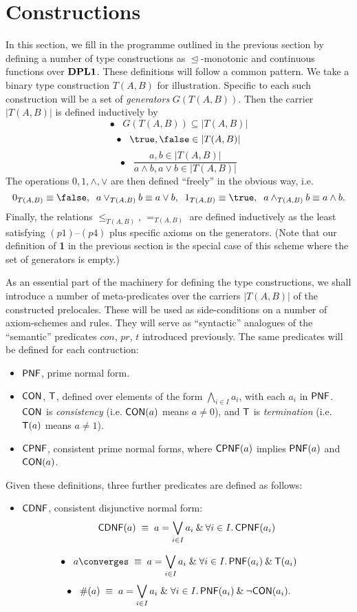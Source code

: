 \section{Constructions}
In this section, we fill in the programme outlined in the previous section by defining a number of type constructions as $\trianglelefteq$-monotonic and continuous functions over ${\bf DPL1}$. These definitions will follow a common pattern. We take a binary type construction $T(A,B)$ for illustration. Specific to each such construction will be a set of {\it generators} $G(T(A,B))$. Then the carrier $|T(A,B)|$ is defined inductively by
\[ \bullet \;\;\; G(T(A,B)) \subseteq |T(A,B)| \]
\[ \bullet \;\;\; \true , \false \in |T(A,B)| \]
\[ \bullet \;\;\; \frac{a, b \in |T(A,B)|}{a \wedge b, a \vee b \in |T(A,B)|} \]
The operations $0, 1, \wedge , \vee$ are then defined ``freely'' in the obvious way, i.e.
\[ 0_{T(A,B)} \equiv \false , \;\; a \vee_{T(A,B)} b \equiv a \vee b, \;\; 1_{T(A,B)} \equiv \true , \;\; a \wedge_{T(A,B)} b \equiv a \wedge b. \]
Finally, the relations $\leq_{T(A,B)}$, $=_{T(A,B)}$ are defined inductively as the least satisfying $(p1)$--$(p4)$ plus specific axioms on the generators. 
(Note that our definition of {\bf 1} in the previous section is the special case of this scheme where the set of generators is empty.)

As an essential part of the machinery for defining the type constructions, we shall introduce a number of meta-predicates over the carriers $|T(A,B)|$ of the constructed prelocales. These will be used as side-conditions on a number of axiom-schemes and rules. They will serve as ``syntactic'' analogues of the ``semantic'' predicates $con$, $pr$, $t$ introduced previously. 
The same predicates will be defined for each contruction:
\begin{itemize}
\item ${\sf PNF}$, prime normal form.
\item ${\sf CON}$, ${\sf T}$, defined over elements of the form $\bigwedge_{i \in I}a_{i}$, 
with each $a_{i}$ in ${\sf PNF}$. 
${\sf CON}$ is {\it consistency} (i.e. ${\sf CON}(a)$ means $a \not= 0$), 
and ${\sf T}$ is {\it termination} (i.e. ${\sf T}(a)$ means $a \not= 1$).
\item ${\sf CPNF}$, consistent prime normal forms, where ${\sf CPNF}(a)$ implies ${\sf PNF}(a)$ and ${\sf CON}(a)$.
\end{itemize}
Given these definitions, three further predicates are defined as follows:
\begin{itemize}
\item ${\sf CDNF}$, consistent disjunctive normal form:
\[ {\sf CDNF}(a) \; \equiv \; a = \bigvee_{i \in I} a_{i} \: \& \: \forall i \in I . \, {\sf CPNF}(a_{i}) \]
\end{itemize}
\[ \bullet \;\;\; a \converges \; \equiv \; a = \bigvee_{i \in I}a_{i} \;\& \; \forall i \in I . \, {\sf PNF}(a_{i}) \: \& \: {\sf T}(a_{i}) \]
\[ \bullet \;\;\; \#(a) \; \equiv \; a = \bigvee_{i \in I}a_{i} \; \& \; \forall i \in I . \, {\sf PNF}(a_{i}) \: \& \: \neg {\sf CON}(a_{i}). \]

